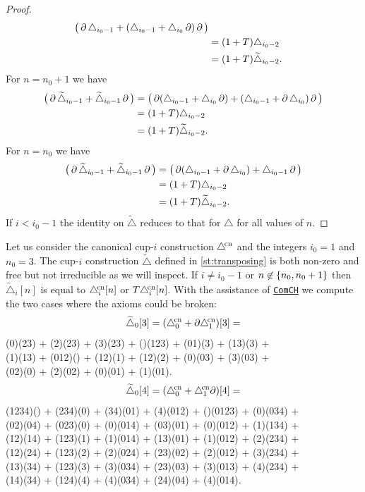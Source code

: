 \begin{proof}
\begin{align*}
		\big(\operatorname{\partial}\triangle_{i_0-1} + (\triangle_{i_0-1} + \triangle_{i_0} \operatorname{\partial})\operatorname{\partial}\big) \\ &=
		(1+T)\triangle_{i_0-2} \\ &=
		(1+T)\widetilde\triangle_{i_0-2}.
	\end{align*}
	For $n = n_0+1$ we have
	\begin{align*}
		\big(\operatorname{\partial}\widetilde\triangle_{i_0-1} + \widetilde\triangle_{i_0-1} \operatorname{\partial}\big) &=
		\big(\operatorname{\partial}(\triangle_{i_0-1} + \triangle_{i_0} \operatorname{\partial}) + (\triangle_{i_0-1} + \operatorname{\partial}\triangle_{i_0})\operatorname{\partial} \big) \\ &=
		(1+T)\triangle_{i_0-2} \\ &=
		(1+T)\widetilde\triangle_{i_0-2}.
	\end{align*}
	For $n = n_0$ we have
	\begin{align*}
		\big(\operatorname{\partial}\widetilde\triangle_{i_0-1} + \widetilde\triangle_{i_0-1} \operatorname{\partial}\big) &=
		\big(\operatorname{\partial}(\triangle_{i_0-1} + \operatorname{\partial}\triangle_{i_0}) + \triangle_{i_0-1}\operatorname{\partial} \big) \\ &=
		(1+T)\triangle_{i_0-2} \\ &=
		(1+T)\widetilde\triangle_{i_0-2}.
	\end{align*}
	If $i<i_0-1$ the identity on $\widetilde\triangle$ reduces to that for $\triangle$ for all values of $n$.
\end{proof}

Let us consider the canonical \mbox{cup-$i$} construction $\triangle^{\!\mathrm{cn}}$ and the integers $i_0=1$ and $n_0=3$.
The \mbox{cup-$i$} construction $\widetilde\triangle$ defined in \cref{st:transposing} is both non-zero and free but not irreducible as we will inspect.
If $i \neq i_0-1$ or $n \not\in \{n_0,n_0+1\}$ then $\widetilde\triangle_i[n]$ is equal to $\triangle^{\!\mathrm{cn}}_i[n]$ or $T\triangle^{\!\mathrm{cn}}_i[n]$.
With the assistance of \href{https://comch.readthedocs.io/en/latest/}{\texttt{ComCH}} we compute the two cases where the axioms could be broken:
\[
\widetilde\triangle_0[3] = (\triangle^{\!\mathrm{cn}}_0 + \partial\triangle^{\!\mathrm{cn}}_1)[3] =
\]
\noindent
{\ttfamily
	(0)(23) + (2)(23) + (3)(23) + ()(123) + (01)(3) + (13)(3) +\\
	(1)(13) + (012)() + (12)(1) + (12)(2) + (0)(03) + (3)(03) +\\
	(02)(0) + (2)(02) + (0)(01) + (1)(01).}
\[
\widetilde\triangle_0[4] = (\triangle^{\!\mathrm{cn}}_0 + \triangle^{\!\mathrm{cn}}_1\partial)[4] =
\]
\noindent
{\ttfamily
	(1234)() + (234)(0) + (34)(01) + (4)(012) + ()(0123) + (0)(034) +\\
	(02)(04) + (023)(0) + (0)(014) + (03)(01) + (0)(012) + (1)(134) +\\
	(12)(14) + (123)(1) + (1)(014) + (13)(01) + (1)(012) + (2)(234) +\\
	(12)(24) + (123)(2) + (2)(024) + (23)(02) + (2)(012) + (3)(234) +\\
	(13)(34) + (123)(3) + (3)(034) + (23)(03) + (3)(013) + (4)(234) +\\
	(14)(34) + (124)(4) + (4)(034) + (24)(04) + (4)(014).}

